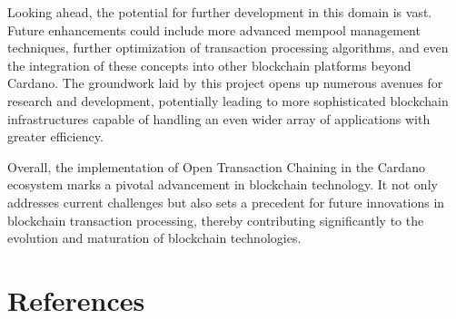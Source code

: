 \documentclass[11pt]{article}
\begin{document}
Looking ahead, the potential for further development in this domain is vast. Future enhancements could include more advanced mempool management techniques, further optimization of transaction processing algorithms, and even the integration of these concepts into other blockchain platforms beyond Cardano. The groundwork laid by this project opens up numerous avenues for research and development, potentially leading to more sophisticated blockchain infrastructures capable of handling an even wider array of applications with greater efficiency.

Overall, the implementation of Open Transaction Chaining in the Cardano ecosystem marks a pivotal advancement in blockchain technology. It not only addresses current challenges but also sets a precedent for future innovations in blockchain transaction processing, thereby contributing significantly to the evolution and maturation of blockchain technologies.

\section{References}

\printbibliography
\end{document}
